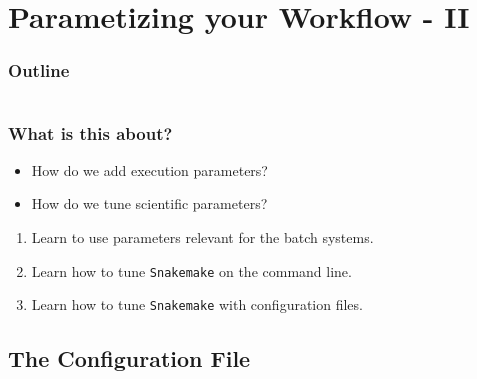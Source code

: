 \section{Parametizing your Workflow - II}

\begin{frame}
    \frametitle{Outline}
    \begin{columns}[t]
        \begin{column}{.5\textwidth}
            \tableofcontents[sections={1-9},currentsection]
        \end{column}
        \begin{column}{.5\textwidth}
            \tableofcontents[sections={10-18},currentsection]
        \end{column}
    \end{columns}
\end{frame}

\begin{frame}
  \frametitle{What is this about?}
  \begin{question}[Questions]
   	\begin{itemize}
      \item How do we add execution parameters?
      \item How do we tune scientific parameters?
    \end{itemize}
  \end{question}
   \begin{docs}[Objectives]
   	 \begin{enumerate} 
        \item Learn to use parameters relevant for the batch systems.
        \item Learn how to tune \texttt{Snakemake} on the command line.
        \item Learn how to tune \texttt{Snakemake} with configuration files.
    \end{enumerate}
  \end{docs}
\end{frame}

\subsection{The Configuration File}

